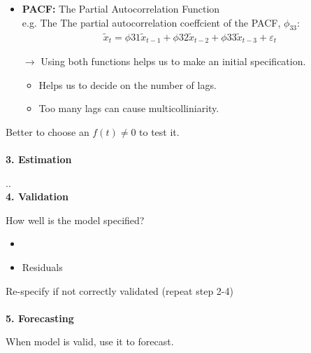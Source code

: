 \begin{multicols}{2}
\begin{itemize}
  \item \textbf{PACF:} The Partial Autocorrelation Function\\
        e.g. The The  partial autocorrelation coeffcient of the PACF, $\phi_{33}$:
        \begin{align*}
         \tilde{x}_t=\phi{31}\tilde{x}_{t-1}+\phi{32}\tilde{x}_{t-2}+\phi{33}\tilde{x}_{t-3}+\varepsilon_t
        \end{align*}
  \item [$\rightarrow$] Using both functions helps us to make an initial specification.
        \begin{itemize}
         \item Helps us to decide on the number of lags.
         \item Too many lags can cause multicolliniarity.
        \end{itemize}
 \end{itemize}
 Better to choose an $f(t)\neq0$ to test it.\\
 \\
 \textbf{3. Estimation}\par
 ..
 \\
 \textbf{4. Validation}\par
 How well is the model specified?
 \begin{itemize}
  \item
  \item Residuals
 \end{itemize}
 Re-specify if not correctly validated (repeat step 2-4)\\
 \\
 \textbf{5. Forecasting}\par
 When model is valid, use it to forecast.



\end{multicols}
